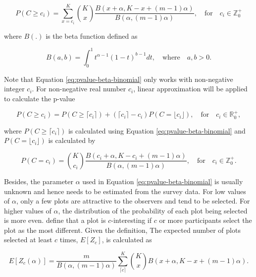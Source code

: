 \documentclass[]{interact}
\theoremstyle{plain}%
\theoremstyle{definition}
\theoremstyle{remark}
\begin{document}
\begin{equation} \label{eq:pvalue-beta-binomial}
P(C \geq c_i) = \sum_{x=c_i}^{K}{K \choose x}\frac{B(x + \alpha, K - x + (m - 1)\alpha)}{B(\alpha, (m-1)\alpha)},\quad \text{for} \quad c_i \in \mathbb{Z}_0^+
\end{equation}

\noindent where \(B(.)\) is the beta function defined as

\begin{equation} \label{eq:betafunction}
B(a, b) = \int_{0}^{1}t^{\alpha - 1}(1-t)^{b-1}dt,\quad \text{where}\quad a,b>0. 
\end{equation}

Note that Equation \ref{eq:pvalue-beta-binomial} only works with
non-negative integer \(c_i\). For non-negative real number \(c_i\),
linear approximation will be applied to calculate the p-value

\begin{equation} \label{eq:pvalue-beta-binomial-approx}
P(C \geq c_i) = P(C \geq \lceil c_i \rceil) + (\lceil c_i \rceil - c_i) P(C = \lfloor c_i \rfloor), \quad \text{for}\quad c_i \in \mathbb{R}_0^+,
\end{equation}

where \(P(C \geq \lceil c_i \rceil)\) is calculated using Equation
\ref{eq:pvalue-beta-binomial} and \(P(C = \lfloor c_i \rfloor)\) is
calculated by

\begin{equation}
P(C = c_i) = {K \choose c_i}\frac{B(c_i + \alpha, K - c_i + (m - 1)\alpha)}{B(\alpha, (m-1)\alpha)},\quad \text{for} \quad c_i \in \mathbb{Z}_0^+.
\end{equation}

Besides, the parameter \(\alpha\) used in Equation
\ref{eq:pvalue-beta-binomial} is usually unknown and hence needs to be
estimated from the survey data. For low values of \(\alpha\), only a few
plots are attractive to the observers and tend to be selected. For
higher values of \(\alpha\), the distribution of the probability of each
plot being selected is more even. \citet{vanderplas2021statistical}
define that a plot is \(c\)-interesting if \(c\) or more participants
select the plot as the most different. Given the definition, The
expected number of plots selected at least \(c\) times, \(E[Z_c]\), is
calculated as

\begin{equation} \label{eq:c-interesting-expectation}
E[Z_c(\alpha)] = \frac{m}{B(\alpha, (m-1)\alpha)}\sum_{\lceil c \rceil}^{K}{K \choose x} B(x + \alpha, K - x + (m-1)\alpha).\end{equation}
\end{document}
